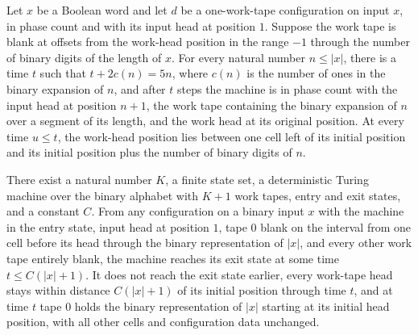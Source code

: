 \begin{theorem}
\label{Turing.inputLength_count}
\leanok
{}
Let $x$ be a Boolean word and let $d$ be a one-work-tape configuration on input $x$, in
phase count and with its input head at position $1$. Suppose the work tape is blank at
offsets from the work-head position in the range $-1$ through the number of binary
digits of the length of $x$. For every natural number $n\le |x|$, there is a time $t$
such that $t+2c(n)=5n$, where $c(n)$ is the number of ones in the binary expansion of
$n$, and after $t$ steps the machine is in phase count with the input head at position
$n+1$, the work tape containing the binary expansion of $n$ over a segment of its
length, and the work head at its original position. At every time $u\le t$, the
work-head position lies between one cell left of its initial position and its initial
position plus the number of binary digits of $n$.
\end{theorem}

\begin{theorem}
\label{Turing.exists_inputLengthTM}
\leanok
{}
There exist a natural number $K$, a finite state set, a deterministic Turing machine
over the binary alphabet with $K+1$ work tapes, entry and exit states, and a constant
$C$. From any configuration on a binary input $x$ with the machine in the entry state,
input head at position $1$, tape $0$ blank on the interval from one cell before its head
through the binary representation of $|x|$, and every other work tape entirely blank,
the machine reaches its exit state at some time $t \le C(|x|+1)$. It does not reach the
exit state earlier, every work-tape head stays within distance $C(|x|+1)$ of its initial
position through time $t$, and at time $t$ tape $0$ holds the binary representation of
$|x|$ starting at its initial head position, with all other cells and configuration data
unchanged.
\end{theorem}
